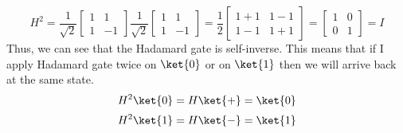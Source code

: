 \documentclass[12pt, oneside]{book}
\theoremstyle{definition}
\theoremstyle{definition}
\theoremstyle{remark}
\begin{document}
\[ H^2=\dfrac{1}{\sqrt{2}}\begin{bmatrix}
    1 & 1 \\
    1 & -1
\end{bmatrix}\dfrac{1}{\sqrt{2}}\begin{bmatrix}
    1 & 1 \\
    1 & -1
\end{bmatrix}=\dfrac{1}{2}\begin{bmatrix}
    1+1 & 1-1 \\
    1-1 & 1+1
\end{bmatrix}=\begin{bmatrix}
    1 & 0 \\
    0 & 1
\end{bmatrix}=I
\]
Thus, we can see that the Hadamard gate is self-inverse.
This means that if I apply Hadamard gate twice on $\ket{0}$ or on $\ket{1}$ then we will arrive back
at the same state. 
\[ H^2\ket{0}=H\ket{+}=\ket{0} \]
\[ H^2\ket{1}=H\ket{-}=\ket{1} \]
\end{document}
